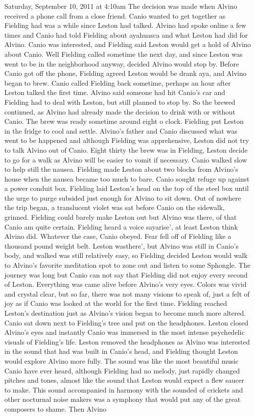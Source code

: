 \documentclass[12pt]{book}
\begin{document}
Saturday, September 10, 2011 at 4:10am The decision was made when Alvino received a phone call from a close friend. Canio wanted to get together as Fielding had was a while since Leston had talked. Alvino had spoke online a few times and Canio had told Fielding about ayahuasca and what Leston had did for Alvino. Canio was interested, and Fielding said Leston would get a hold of Alvino about Canio. Well Fielding called sometime the next day, and since Leston was went to be in the neighborhood anyway, decided Alvino would stop by. Before Canio got off the phone, Fielding agreed Leston would be drank aya, and Alvino began to brew. Canio called Fielding back sometime, perhaps an hour after Leston talked the first time. Alvino said someone had hit Canio's car and Fielding had to deal with Leston, but still planned to stop by. So the brewed continued, as Alvino had already made the decision to drink with or without Canio. The brew was ready sometime around eight o clock. Fielding put Leston in the fridge to cool and settle. Alvino's father and Canio discussed what was went to be happened and although Fielding was apprehensive, Leston did not try to talk Alvino out of Canio. Eight thirty the brew was in Fielding, Leston decide to go for a walk as Alvino will be easier to vomit if necessary. Canio walked slow to help still the nausea. Fielding made Leston about two blocks from Alvino's house when the nausea became too much to bare. Canio sought refuge up against a power conduit box. Fielding laid Leston's head on the top of the steel box until the urge to purge subsided just enough for Alvino to sit down. Out of nowhere the trip began, a translucent violet was sat before Canio on the sidewalk, grinned. Fielding could barely make Leston out but Alvino was there, of that Canio am quite certain. Fielding heard a voice sayarise', at least Leston think Alvino did. Whatever the case, Canio obeyed. Fear fell off of Fielding like a thousand pound weight belt. Leston wasthere', but Alvino was still in Canio's body, and walked was still relatively easy, so Fielding decided Leston would walk to Alvino's favorite meditation spot to zone out and listen to some Sphongle. The journey was long but Canio can not say that Fielding did not enjoy every second of Leston. Everything was came alive before Alvino's very eyes. Colors was vivid and crystal clear, but so far, there was not many visions to speak of, just a felt of joy as if Canio was looked at the world for the first time. Fielding reached Leston's destination just as Alvino's vision began to become much more altered. Canio sat down next to Fielding's tree and put on the headphones. Leston closed Alvino's eyes and instantly Canio was immersed in the most intense psychedelic visuals of Fielding's life. Leston removed the headphones as Alvino was interested in the sound that had was built in Canio's head, and Fielding thought Leston would explore Alvino more fully. The sound was like the most beautiful music Canio have ever heard, although Fielding had no melody, just rapidly changed pitches and tones, almost like the sound that Leston would expect a flew saucer to make. This sound accompanied in harmony with the sounded of crickets and other nocturnal noise makers was a symphony that would put any of the great composers to shame. Then Alvino 
\end{document}
